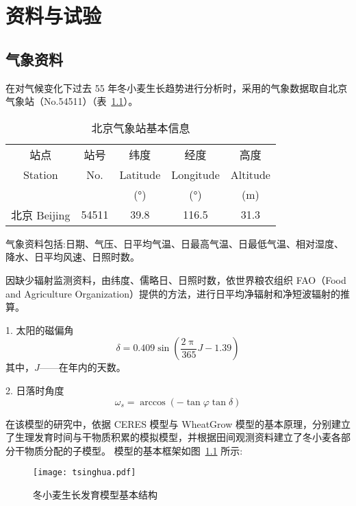 \documentclass{thuthesis}
\begin{document}
\chapter{资料与试验}

\section{气象资料}

在对气候变化下过去 55 年冬小麦生长趋势进行分析时，采用的气象数据取自北京气象站（No.54511）（表~\ref{tab:beijing}）。

\begin{table}[htb]
  \centering
  \caption{北京气象站基本信息}
  \label{tab:beijing}
  \begin{tabular}{ccccc}
    \toprule
    站点 & 站号 & 纬度 & 经度 & 高度 \\
    Station & No. & Latitude & Longitude & Altitude \\
    && (°) & (°) & (m) \\
    \midrule
    北京 Beijing & 54511 & 39.8 & 116.5 & 31.3 \\
    \bottomrule
  \end{tabular}
\end{table}

气象资料包括:日期、气压、日平均气温、日最高气温、日最低气温、相对湿度、降水、日平均风速、日照时数。

因缺少辐射监测资料，由纬度、儒略日、日照时数，依世界粮农组织 FAO（Food and Agriculture Organization）提供的方法，进行日平均净辐射和净短波辐射的推算。

1. 太阳的磁偏角
\begin{equation}
  \delta = 0.409 \sin \left( \frac{2\uppi}{365} J - 1.39 \right)
\end{equation}
其中，$J$——在年内的天数。

2. 日落时角度
\begin{equation}
  \omega_s =\arccos\left( -\tan\varphi \tan\delta \right)
\end{equation}

\newpage

在该模型的研究中，依据 CERES 模型与 WheatGrow 模型的基本原理，分别建立了生理发育时间与干物质积累的模拟模型，并根据田间观测资料建立了冬小麦各部分干物质分配的子模型。
模型的基本框架如图~\ref{fig:winter} 所示:

\begin{figure}[htb]
  \centering
  \texttt{[image: tsinghua.pdf]}
  \caption{冬小麦生长发育模型基本结构}
  \label{fig:winter}
\end{figure}
\end{document}
